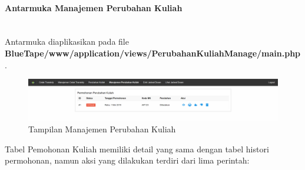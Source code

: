 \documentclass[a4paper,twoside]{article}
\newcommand{\myparagraph}[1]{\paragraph{#1}\mbox{}\\}
\begin{document}
\begin{enumerate}
		\myparagraph{Antarmuka Manajemen Perubahan Kuliah}
		Antarmuka diaplikasikan pada file \textbf{BlueTape/www/application/views/PerubahanKuliahManage/main.php}.
		\begin{figure} [H]
			\centering  
			\includegraphics[scale=0.5]{Tampilan-Manajemen-Perubahan-Kuliah.png}  
			\caption{Tampilan Manajemen Perubahan Kuliah} 
		\end{figure}
		Tabel Pemohonan Kuliah memiliki detail yang sama dengan tabel histori permohonan, namun aksi yang dilakukan terdiri dari lima perintah:
		

\end{enumerate}
\end{document}
